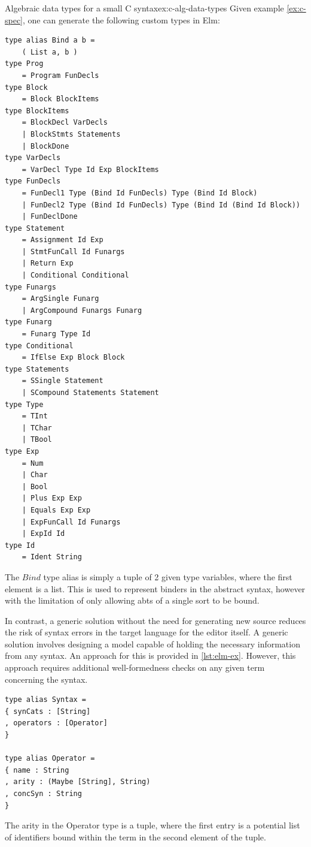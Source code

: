 \begin{example}{Algebraic data types for a small C syntax}{ex:c-alg-data-types}
  Given example \cref{ex:c-spec}, one can generate the following custom types in Elm:
  \begin{lstlisting}[style=examplestyle]
type alias Bind a b =
    ( List a, b )
type Prog
    = Program FunDecls
type Block
    = Block BlockItems
type BlockItems
    = BlockDecl VarDecls
    | BlockStmts Statements
    | BlockDone
type VarDecls
    = VarDecl Type Id Exp BlockItems
type FunDecls
    = FunDecl1 Type (Bind Id FunDecls) Type (Bind Id Block)
    | FunDecl2 Type (Bind Id FunDecls) Type (Bind Id (Bind Id Block))
    | FunDeclDone
type Statement
    = Assignment Id Exp
    | StmtFunCall Id Funargs
    | Return Exp
    | Conditional Conditional
type Funargs
    = ArgSingle Funarg
    | ArgCompound Funargs Funarg
type Funarg
    = Funarg Type Id
type Conditional
    = IfElse Exp Block Block
type Statements
    = SSingle Statement
    | SCompound Statements Statement
type Type
    = TInt
    | TChar
    | TBool
type Exp
    = Num
    | Char
    | Bool
    | Plus Exp Exp
    | Equals Exp Exp
    | ExpFunCall Id Funargs
    | ExpId Id
type Id
    = Ident String
\end{lstlisting}

  The $Bind$ type alias is simply a tuple of 2 given type variables,
  where the first element is a list. This is used to represent binders in the
  abstract syntax, however with the limitation of only allowing abts of a single
  sort to be bound.
\end{example}

In contrast, a generic solution without the need for generating new source reduces the risk of syntax errors in the target language for the editor itself. A generic solution involves designing a model capable of holding the necessary information from any syntax. An approach for this is provided in \cref{lst:elm-ex}. However, this approach requires additional well-formedness checks on any given term concerning the syntax.

\begin{lstlisting}[style=inline,caption={Elm Records for storing syntax information},label={lst:elm-ex}]
type alias Syntax =
{ synCats : [String]
, operators : [Operator]
}

type alias Operator =
{ name : String
, arity : (Maybe [String], String)
, concSyn : String
}
\end{lstlisting}

The arity in the Operator type is a tuple, where the first entry is a potential
list of identifiers bound within the term in the second element of the tuple.

